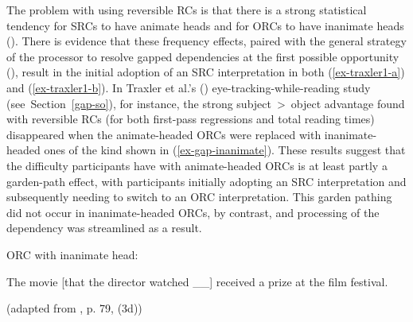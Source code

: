The problem with using reversible RCs is that there is a strong statistical tendency for SRCs to have animate heads and for ORCs to have inanimate heads (\cite{gennari.macdonald2008,mak.etal2006,reali.christiansen2007}). There is evidence that these frequency effects, paired with the general strategy of the processor to resolve gapped dependencies at the first possible opportunity (\cite{frazier1987,stowe1986}), result in the initial adoption of an SRC interpretation in both (\ref{ex-traxler1-a}) and (\ref{ex-traxler1-b}). In Traxler et al.'s (\citeyear{traxler.etal2002}) eye-tracking-while-reading study (see~Section~\ref{gap-so}), for instance, the strong subject~>~object advantage found with reversible RCs (for both first-pass regressions and total reading times) disappeared when the animate-headed ORCs were replaced with inanimate-headed ones of the kind shown in (\ref{ex-gap-inanimate}). These results suggest that the difficulty participants have with animate-headed ORCs is at least partly a garden-path effect, with participants initially adopting an SRC interpretation and subsequently needing to switch to an ORC interpretation. This garden pathing did not occur in inanimate-headed ORCs, by contrast, and processing of the dependency was streamlined as a result.

\pex 
ORC with inanimate head:\par\nobreak\vspace{5pt}\label{ex-gap-inanimate}\par\nobreak
The movie [that the director watched \_\_] received a prize at the film festival.\par\nobreak\vspace{5pt}
\hfill (adapted from \cite{traxler.etal2002}, p. 79, (3d))
\xe 



